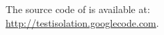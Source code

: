 










The source code of \ourtool is available at:\\ \url{http://testisolation.googlecode.com}.




